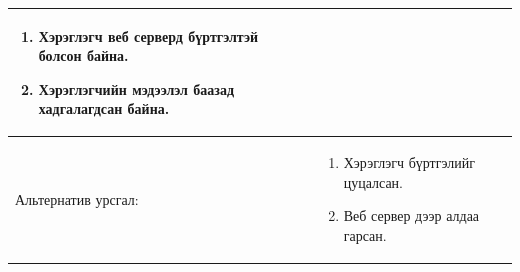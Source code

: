 \begin{center}
\begin{table}[!htbp]
\begin{tabular}{|p{4cm}|p{11cm}|}
\begin{enumerate}
									\item Хэрэглэгч веб серверд бүртгэлтэй болсон байна. 
									\item Хэрэглэгчийн мэдээлэл баазад хадгалагдсан байна. 
				\end{enumerate}	   
\\				   \hline
				Альтернатив урсгал: &  \begin{enumerate}
									\item Хэрэглэгч бүртгэлийг цуцалсан.
									\item Веб сервер дээр алдаа гарсан. 
										\end{enumerate}
				\\	\hline
		\end{tabular}
	\end{table}
\end{center}


